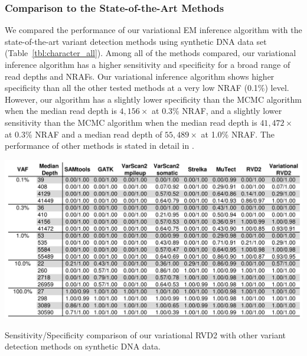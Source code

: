 \documentclass[11pt,reqno]{amsart}
\begin{document}
\subsubsection{Comparison to the State-of-the-Art Methods}
We compared the performance of our variational EM inference algorithm with the state-of-the-art variant detection methods using synthetic DNA data set (Table~\ref{tbl:character_all}).
Among all of the methods compared, our variational inference algorithm has a higher sensitivity and specificity for a broad range of read depths and NRAFs.
Our variational inference algorithm shows higher specificity than all the other tested methods at a very low NRAF (0.1\%) level.
However, our algorithm has a slightly lower specificity than the MCMC algorithm when the median read depth is $4,156\times$ at 0.3\% NRAF, and a slightly lower sensitivity than the MCMC algorithm when the median read depth is $41,472\times$ at 0.3\% NRAF and a median read depth of $55,489\times$ at 1.0\% NRAF.
The performance of other methods is stated in detail in \citet{he2015rvd2}.
\begin{table}[htbp]
\centering
\includegraphics[width=1.0\textwidth]{tables/character_all.png}
\caption{Sensitivity/Specificity comparison of our variational RVD2 with other variant detection methods on synthetic DNA data.}
\label{tbl:character_all}
\end{table}
\end{document}
